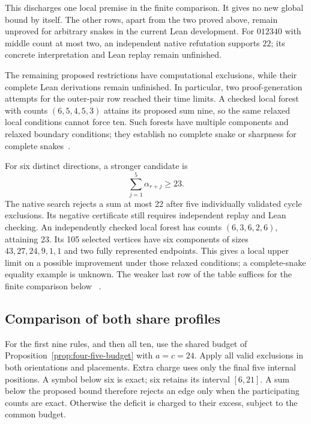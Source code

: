 \documentclass[11pt,a4paper]{article}
\theoremstyle{definition}
\theoremstyle{remark}
\begin{document}
This discharges one local premise in the finite comparison. It gives no
new global bound by itself. The other rows, apart from the two proved
above, remain unproved for arbitrary snakes in the current Lean development.
For $012340$ with middle count at most two, an independent native refutation
supports $22$; its concrete interpretation and Lean replay remain unfinished.

The remaining proposed restrictions have computational exclusions, while their
complete Lean derivations remain unfinished. In particular, two proof-generation
attempts for the outer-pair row reached their time limits. A checked local
forest with counts $(6,5,4,5,3)$ attains its proposed sum nine, so the same
relaxed local conditions cannot force ten. Such forests have multiple
components and relaxed boundary conditions; they establish no complete
snake or sharpness for complete snakes~\cite{pairbudgetarchive}.

For six distinct directions, a stronger candidate is
\[
\sum_{j=1}^{5}\alpha_{r+j}\ge23.
\]
The native search rejects a sum at most 22 after five individually validated
cycle exclusions. Its negative certificate still requires independent
replay and Lean checking. An independently checked local forest has counts
$(6,3,6,2,6)$, attaining 23. Its 105 selected vertices have six components
of sizes $43,27,24,9,1,1$ and two fully represented endpoints. This gives
a local upper limit on a possible improvement under those relaxed
conditions; a complete-snake equality example is unknown. The weaker
last row of the table suffices for the finite comparison below
~\cite{totalcountarchive}.

\subsection{Comparison of both share profiles}
For the first nine rules, and then all ten, use the shared budget of
Proposition~\ref{prop:four-five-budget} with $a=c=24$. Apply all valid
exclusions in both orientations and placements. Extra charge uses only
the final five internal positions. A symbol below six is exact; six
retains its interval $[6,21]$. A sum below the proposed bound therefore
rejects an edge only when the participating counts are exact. Otherwise
the deficit is charged to their excess, subject to the common budget.
\end{document}

